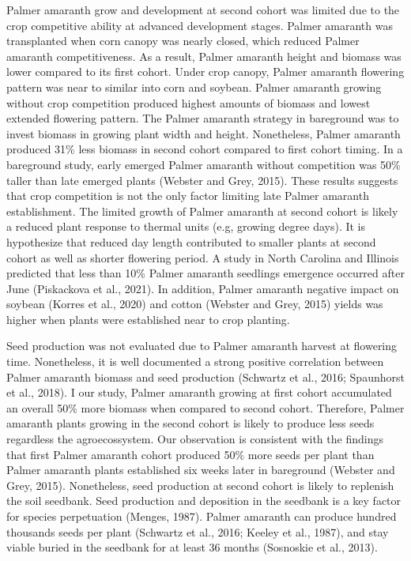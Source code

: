 \documentclass[utf8]{frontiersSCNS}
\begin{document}
Palmer amaranth grow and development at second cohort was limited due to
the crop competitive ability at advanced development stages. Palmer
amaranth was transplanted when corn canopy was nearly closed, which
reduced Palmer amaranth competitiveness. As a result, Palmer amaranth
height and biomass was lower compared to its first cohort. Under crop
canopy, Palmer amaranth flowering pattern was near to similar into corn
and soybean. Palmer amaranth growing without crop competition produced
highest amounts of biomass and lowest extended flowering pattern. The
Palmer amaranth strategy in bareground was to invest biomass in growing
plant width and height. Nonetheless, Palmer amaranth produced 31\% less
biomass in second cohort compared to first cohort timing. In a
bareground study, early emerged Palmer amaranth without competition was
50\% taller than late emerged plants (Webster and Grey, 2015). These
results suggests that crop competition is not the only factor limiting
late Palmer amaranth establishment. The limited growth of Palmer
amaranth at second cohort is likely a reduced plant response to thermal
units (e.g, growing degree days). It is hypothesize that reduced day
length contributed to smaller plants at second cohort as well as shorter
flowering period. A study in North Carolina and Illinois predicted that
less than 10\% Palmer amaranth seedlings emergence occurred after June
(Piskackova et al., 2021). In addition, Palmer amaranth negative impact
on soybean (Korres et al., 2020) and cotton (Webster and Grey, 2015)
yields was higher when plants were established near to crop planting.

Seed production was not evaluated due to Palmer amaranth harvest at
flowering time. Nonetheless, it is well documented a strong positive
correlation between Palmer amaranth biomass and seed production
(Schwartz et al., 2016; Spaunhorst et al., 2018). I our study, Palmer
amaranth growing at first cohort accumulated an overall 50\% more
biomass when compared to second cohort. Therefore, Palmer amaranth
plants growing in the second cohort is likely to produce less seeds
regardless the agroecossystem. Our observation is consistent with the
findings that first Palmer amaranth cohort produced 50\% more seeds per
plant than Palmer amaranth plants established six weeks later in
bareground (Webster and Grey, 2015). Nonetheless, seed production at
second cohort is likely to replenish the soil seedbank. Seed production
and deposition in the seedbank is a key factor for species perpetuation
(Menges, 1987). Palmer amaranth can produce hundred thousands seeds per
plant (Schwartz et al., 2016; Keeley et al., 1987), and stay viable
buried in the seedbank for at least 36 months (Sosnoskie et al., 2013).
\end{document}
